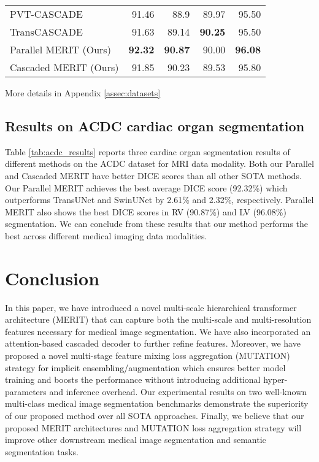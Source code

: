 \documentclass{midl}
\begin{document}
\begin{table*}[t]
{{{\begin{tabular}{lrrrr}
PVT-CASCADE \cite{rahman2023medical}      & 91.46                        & 88.9                   & 89.97                   & 95.50                   \\
TransCASCADE \cite{rahman2023medical}    & 91.63                        & 89.14                 & \textbf{90.25}                   & 95.50 \\
\midrule
Parallel MERIT (Ours)      & \textbf{92.32}                        & \textbf{90.87}                   & 90.00                   & \textbf{96.08}                   \\
Cascaded MERIT (Ours)    & 91.85                      & 90.23                 & 89.53                   & 95.80 \\
\bottomrule \end{tabular}}
}}
\footnotesize{ More details in Appendix \ref{assec:datasets}}\\
\vspace{-0.3cm}
\end{table*}

\subsection{Results on ACDC cardiac organ segmentation}
Table \ref{tab:acdc_results} reports three cardiac organ segmentation results of different methods on the ACDC dataset for MRI data modality. Both our Parallel and Cascaded MERIT have better DICE scores than all other SOTA methods. Our Parallel MERIT achieves the best average DICE score (92.32\%) which outperforms TransUNet and SwinUNet by 2.61\% and 2.32\%, respectively. Parallel MERIT also shows the best DICE scores in RV (90.87\%) and LV (96.08\%) segmentation. We can conclude from these results that our method performs the best across different medical imaging data modalities. 

\section{Conclusion}
\label{sec:conclution}
In this paper, we have introduced a novel multi-scale hierarchical transformer architecture (MERIT) that can capture both the multi-scale and multi-resolution features necessary for medical image segmentation. We have also incorporated an attention-based cascaded decoder to further refine features. Moreover, we have proposed a novel multi-stage feature mixing loss aggregation (MUTATION) strategy \textcolor{black}{for implicit ensembling/augmentation} which ensures better model training and boosts the performance without introducing additional hyper-parameters and inference overhead. Our experimental results on two well-known multi-class medical image segmentation benchmarks demonstrate the superiority of our proposed method over all SOTA approaches. Finally, we believe that our proposed MERIT architectures and MUTATION loss aggregation strategy will improve other downstream medical image segmentation and semantic segmentation tasks.   
\end{document}
